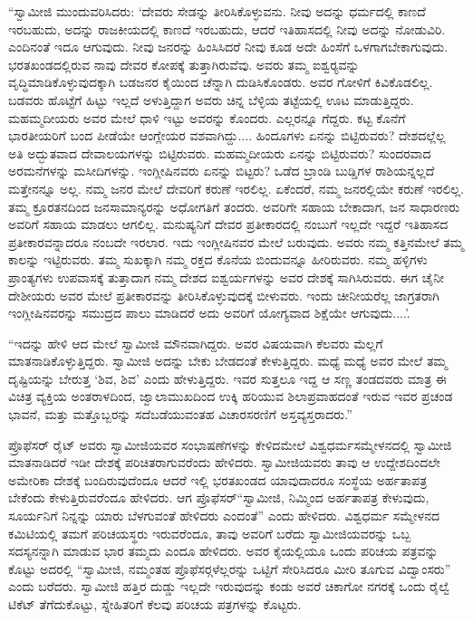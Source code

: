  “ಸ್ವಾಮೀಜಿ ಮುಂದುವರಿಸಿದರು: ‘ದೇವರು ಸೇಡನ್ನು ತೀರಿಸಿಕೊಳ್ಳುವನು. ನೀವು ಅದನ್ನು ಧರ್ಮದಲ್ಲಿ ಕಾಣದೆ ಇರಬಹುದು, ಅದನ್ನು ರಾಜಕೀಯದಲ್ಲಿ ಕಾಣದೆ ಇರಬಹುದು, ಆದರೆ ಇತಿಹಾಸದಲ್ಲಿ ನೀವು ಅದನ್ನು ನೋಡುವಿರಿ. ಎಂದಿನಂತೆ ಇದೂ ಆಗುವುದು. ನೀವು ಜನರನ್ನು ಹಿಂಸಿಸಿದರೆ ನೀವು ಕೂಡ ಅದೇ ಹಿಂಸೆಗೆ ಒಳಗಾಗಬೇಕಾಗುವುದು. ಭರತಖಂಡದಲ್ಲಿರುವ ನಾವು ದೇವರ ಕೋಪಕ್ಕೆ ತುತ್ತಾಗಿರುವೆವು. ಅವರು ತಮ್ಮ ಐಶ್ವರ‍್ಯವನ್ನು ವೃದ್ಧಿಮಾಡಿಕೊಳ್ಳುವುದಕ್ಕಾಗಿ ಬಡಜನರ ಕೈಯಿಂದ ಚೆನ್ನಾಗಿ ದುಡಿಸಿಕೊಂಡರು. ಅವರ ಗೋಳಿಗೆ ಕಿವಿಕೊಡಲಿಲ್ಲ. ಬಡವರು ಹೊಟ್ಟೆಗೆ ಹಿಟ್ಟು ಇಲ್ಲದೆ ಅಳುತ್ತಿದ್ದಾಗ ಅವರು ಚಿನ್ನ ಬೆಳ್ಳಿಯ ತಟ್ಟೆಯಲ್ಲಿ ಊಟ ಮಾಡುತ್ತಿದ್ದರು. ಮಹಮ್ಮದೀಯರು ಅವರ ಮೇಲೆ ಧಾಳಿ ಇಟ್ಟು ಅವರನ್ನು ಕೊಂದರು. ಎಲ್ಲರನ್ನೂ ಗೆದ್ದರು. ಕಟ್ಟ ಕೊನೆಗೆ ಭಾರತೀಯರಿಗೆ ಬಂದ ಪೀಡೆಯೇ ಆಂಗ್ಲೇಯರ ವಶವಾಗಿದ್ದು.... ಹಿಂದೂಗಳು ಏನನ್ನು ಬಿಟ್ಟಿರುವರು? ದೇಶದಲ್ಲೆಲ್ಲ ಅತಿ ಅದ್ಭುತವಾದ ದೇವಾಲಯಗಳನ್ನು ಬಿಟ್ಟಿರುವರು. ಮಹಮ್ಮದೀಯರು ಏನನ್ನು ಬಿಟ್ಟಿರುವರು? ಸುಂದರವಾದ ಅರಮನೆಗಳನ್ನು ಮಸೀದಿಗಳನ್ನು. ಇಂಗ್ಲೀಷಿನವರು ಏನನ್ನು ಬಿಟ್ಟರು? ಒಡೆದ ಬ್ರಾಂಡಿ ಬುಡ್ಡಿಗಳ ರಾಶಿಯನ್ನಲ್ಲದೆ ಮತ್ತೇನನ್ನೂ ಅಲ್ಲ. ನಮ್ಮ ಜನರ ಮೇಲೆ ದೇವರಿಗೆ ಕರುಣೆ ಇರಲಿಲ್ಲ. ಏಕೆಂದರೆ, ನಮ್ಮ ಜನರಲ್ಲಿಯೇ ಕರುಣೆ ಇರಲಿಲ್ಲ. ತಮ್ಮ ಕ್ರೂರತನದಿಂದ ಜನಸಾಮಾನ್ಯರನ್ನು ಅಧೋಗತಿಗೆ ತಂದರು. ಅವರಿಗೇ ಸಹಾಯ ಬೇಕಾದಾಗ, ಜನ ಸಾಧಾರಣರು ಅವರಿಗೆ ಸಹಾಯ ಮಾಡಲು ಆಗಲಿಲ್ಲ. ಮನುಷ್ಯನಿಗೆ ದೇವರ ಪ್ರತೀಕಾರದಲ್ಲಿ ನಂಬುಗೆ ಇಲ್ಲದೇ ಇದ್ದರೆ ಇತಿಹಾಸದ ಪ್ರತೀಕಾರವನ್ನಾದರೂ ನಂಬದೇ ಇರಲಾರ. ಇದು ಇಂಗ್ಲೀಷಿನವರ ಮೇಲೆ ಬರುವುದು. ಅವರು ನಮ್ಮ ಕತ್ತಿನಮೇಲೆ ತಮ್ಮ ಕಾಲನ್ನು ಇಟ್ಟಿರುವರು. ತಮ್ಮ ಸುಖಕ್ಕಾಗಿ ನಮ್ಮ ರಕ್ತದ ಕೊನೆಯ ಬಿಂದುವನ್ನೂ ಹೀರಿರುವರು. ನಮ್ಮ ಹಳ್ಳಿಗಳು ಪ್ರಾಂತ್ಯಗಳು ಉಪವಾಸಕ್ಕೆ ತುತ್ತಾದಾಗ ನಮ್ಮ ದೇಶದ ಐಶ್ವರ್ಯಗಳನ್ನು ಅವರ ದೇಶಕ್ಕೆ ಸಾಗಿಸಿರುವರು. ಈಗ ಚೈನೀ ದೇಶೀಯರು ಅವರ ಮೇಲೆ ಪ್ರತೀಕಾರವನ್ನು ತೀರಿಸಿಕೊಳ್ಳುವುದಕ್ಕೆ ಬೀಳುವರು. ಇಂದು ಚೀನೀಯರೆಲ್ಲ ಜಾಗ್ರತರಾಗಿ ಇಂಗ್ಲೀಷಿನವರನ್ನು ಸಮುದ್ರದ ಪಾಲು ಮಾಡಿದರೆ ಅದು ಅವರಿಗೆ ಯೋಗ್ಯವಾದ ಶಿಕ್ಷೆಯೇ ಆಗುವುದು....’. 

 “ಇದನ್ನು ಹೇಳಿ ಆದ ಮೇಲೆ ಸ್ವಾಮೀಜಿ ಮೌನವಾಗಿದ್ದರು. ಅವರ ವಿಷಯವಾಗಿ ಕೆಲವರು ಮೆಲ್ಲಗೆ ಮಾತನಾಡಿಕೊಳ್ಳುತ್ತಿದ್ದರು. ಸ್ವಾಮೀಜಿ ಅದನ್ನು ಬೇಕು ಬೇಡದಂತೆ ಕೇಳುತ್ತಿದ್ದರು. ಮಧ್ಯೆ ಮಧ್ಯೆ ಅವರ ಮೇಲೆ ತಮ್ಮ ದೃಷ್ಟಿಯನ್ನು ಬೇರುತ್ತ ‘ಶಿವ, ಶಿವ’ ಎಂದು ಹೇಳುತ್ತಿದ್ದರು. ಇವರ ಸುತ್ತಲೂ ಇದ್ದ ಆ ಸಣ್ಣ ತಂಡದವರು ಮಾತ್ರ ಈ ವಿಚಿತ್ರ ವ್ಯಕ್ತಿಯ ಅಂತರಾಳದಿಂದ, ಜ್ವಾಲಾಮುಖದಿಂದ ಉಕ್ಕಿ ಹರಿಯುವ ಶಿಲಾಪ್ರವಾಹದಂತೆ ಇರುವ ಇವರ ಪ್ರಚಂಡ ಭಾವನೆ, ಮತ್ತು ಮತ್ತೊಬ್ಬರನ್ನು ಸದೆಬಡೆಯುವಂತಹ ವಿಚಾರಸರಣಿಗೆ ಅಸ್ತವ್ಯಸ್ತರಾದರು.” 

 ಪ್ರೊಫೆಸರ್ ರೈಟ್ ಅವರು ಸ್ವಾಮೀಜಿಯವರ ಸಂಭಾಷಣೆಗಳನ್ನು ಕೇಳಿದಮೇಲೆ ವಿಶ್ವಧರ್ಮಸಮ್ಮೇಳನದಲ್ಲಿ ಸ್ವಾಮೀಜಿ ಮಾತನಾಡಿದರೆ ಇಡೀ ದೇಶಕ್ಕೆ ಪರಿಚಿತರಾಗುವರೆಂದು ಹೇಳಿದರು. ಸ್ವಾಮೀಜಿಯವರು ತಾವು ಆ ಉದ್ದೇಶದಿಂದಲೇ ಅಮೇರಿಕಾ ದೇಶಕ್ಕೆ ಬಂದಿರುವುದೆಂದೂ ಆದರೆ ಇಲ್ಲಿ ಭರತಖಂಡದ ಯಾವುದಾದರೂ ಸಂಸ್ಥೆಯ ಅರ್ಹತಾಪತ್ರ ಬೇಕೆಂದು ಕೇಳುತ್ತಿರುವರೆಂದೂ ಹೇಳಿದರು. ಆಗ ಪ್ರೊಫೆಸರ್\break “ಸ್ವಾಮೀಜಿ, ನಿಮ್ಮಿಂದ ಅರ್ಹತಾಪತ್ರ ಕೇಳುವುದು, ಸೂರ್ಯನಿಗೆ ನಿನ್ನನ್ನು ಯಾರು ಬೆಳಗುವಂತೆ ಹೇಳಿದರು ಎಂದಂತೆ” ಎಂದು ಹೇಳಿದರು. ವಿಶ್ವಧರ್ಮ ಸಮ್ಮೇಳನದ ಕಮಿಟಿಯಲ್ಲಿ ತಮಗೆ ಪರಿಚಯಸ್ಥರು ಇರುವರೆಂದೂ, ತಾವು ಅವರಿಗೆ ಬರೆದು ಸ್ವಾಮೀಜಿಯವರನ್ನು ಒಬ್ಬ ಸದಸ್ಯನನ್ನಾಗಿ ಮಾಡುವ ಭಾರ ತಮ್ಮದು ಎಂದೂ ಹೇಳಿದರು. ಅವರ ಕೈಯಲ್ಲಿಯೂ ಒಂದು ಪರಿಚಯ ಪತ್ರವನ್ನು ಕೊಟ್ಟು ಅದರಲ್ಲಿ “ಸ್ವಾಮೀಜಿ, ನಮ್ಮಂತಹ ಪ್ರೊಫೆಸರ್‍ಗಳೆಲ್ಲರನ್ನು ಒಟ್ಟಿಗೆ ಸೇರಿಸಿದರೂ ಮೀರಿ ತೂಗುವ ವಿದ್ವಾಂಸರು” ಎಂದು ಬರೆದರು. ಸ್ವಾಮೀಜಿ ಹತ್ತಿರ ದುಡ್ಡು ಇಲ್ಲದೇ ಇರುವುದನ್ನು ಕಂಡು ಅವರೆ ಚಿಕಾಗೋ ನಗರಕ್ಕೆ ಒಂದು ರೈಲ್ವೆ ಟಿಕೆಟ್ ತೆಗೆದುಕೊಟ್ಟು, ಸ್ನೇಹಿತರಿಗೆ ಕೆಲವು ಪರಿಚಯ ಪತ್ರಗಳನ್ನು ಕೊಟ್ಟರು. 

